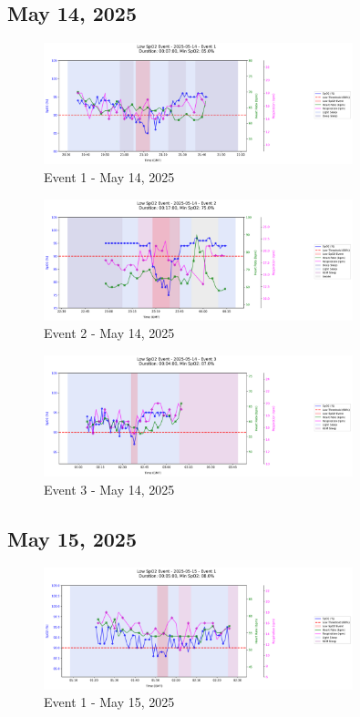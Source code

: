 \documentclass{article}
\begin{document}
\subsection{May 14, 2025}
\begin{figure}[htbp]
    \centering
    \includegraphics[width=0.8\textwidth]{images/2025-05-14_event_1.png}
    \caption{Event 1 - May 14, 2025}
\end{figure}
\begin{figure}[htbp]
    \centering
    \includegraphics[width=0.8\textwidth]{images/2025-05-14_event_2.png}
    \caption{Event 2 - May 14, 2025}
\end{figure}
\begin{figure}[htbp]
    \centering
    \includegraphics[width=0.8\textwidth]{images/2025-05-14_event_3.png}
    \caption{Event 3 - May 14, 2025}
\end{figure}
\clearpage

\subsection{May 15, 2025}
\begin{figure}[htbp]
    \centering
    \includegraphics[width=0.8\textwidth]{images/2025-05-15_event_1.png}
    \caption{Event 1 - May 15, 2025}
\end{figure}
\clearpage
\end{document}
